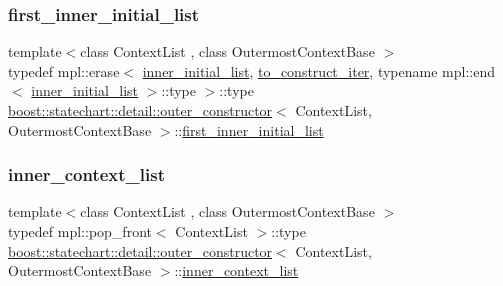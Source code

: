 \mbox{\label{structboost_1_1statechart_1_1detail_1_1outer__constructor_aeaaf7a8578d83f93cf3a1f90011ec87b}} 
\subsubsection{\texorpdfstring{first\+\_\+inner\+\_\+initial\+\_\+list}{first\_inner\_initial\_list}}
{\footnotesize\ttfamily template$<$class Context\+List , class Outermost\+Context\+Base $>$ \\
typedef mpl\+::erase$<$ \mbox{\hyperlink{structboost_1_1statechart_1_1detail_1_1outer__constructor_a4c1c7fd76b5d06da5ebc2dc2c99444f9}{inner\+\_\+initial\+\_\+list}}, \mbox{\hyperlink{structboost_1_1statechart_1_1detail_1_1outer__constructor_a90925740f3c0336f09a152967a7e7173}{to\+\_\+construct\+\_\+iter}}, typename mpl\+::end$<$ \mbox{\hyperlink{structboost_1_1statechart_1_1detail_1_1outer__constructor_a4c1c7fd76b5d06da5ebc2dc2c99444f9}{inner\+\_\+initial\+\_\+list}} $>$\+::type $>$\+::type \mbox{\hyperlink{structboost_1_1statechart_1_1detail_1_1outer__constructor}{boost\+::statechart\+::detail\+::outer\+\_\+constructor}}$<$ Context\+List, Outermost\+Context\+Base $>$\+::\mbox{\hyperlink{structboost_1_1statechart_1_1detail_1_1outer__constructor_aeaaf7a8578d83f93cf3a1f90011ec87b}{first\+\_\+inner\+\_\+initial\+\_\+list}}}

\mbox{\label{structboost_1_1statechart_1_1detail_1_1outer__constructor_a54865d68e270edafc233566aa9b296f0}} 
\subsubsection{\texorpdfstring{inner\+\_\+context\+\_\+list}{inner\_context\_list}}
{\footnotesize\ttfamily template$<$class Context\+List , class Outermost\+Context\+Base $>$ \\
typedef mpl\+::pop\+\_\+front$<$ Context\+List $>$\+::type \mbox{\hyperlink{structboost_1_1statechart_1_1detail_1_1outer__constructor}{boost\+::statechart\+::detail\+::outer\+\_\+constructor}}$<$ Context\+List, Outermost\+Context\+Base $>$\+::\mbox{\hyperlink{structboost_1_1statechart_1_1detail_1_1outer__constructor_a54865d68e270edafc233566aa9b296f0}{inner\+\_\+context\+\_\+list}}}

